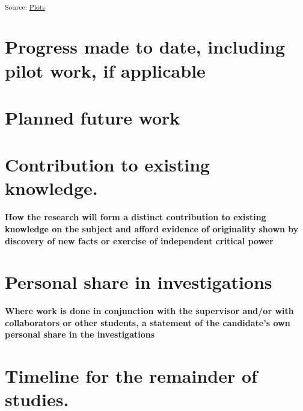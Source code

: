 \documentclass[
  letterpaper,
  DIV=11,
  numbers=noendperiod]{scrartcl}
\begin{document}
\textsubscript{Source:
\href{https://juliam98.github.io/phd-upgrade-proposal/notebooks/plots-preview.html\#cell-fig-lev_hc_vs_sz}{Plots}}

\section{Progress made to date, including pilot work, if
applicable}\label{progress-made-to-date-including-pilot-work-if-applicable}

\section{Planned future work}\label{planned-future-work}

\section{Contribution to existing
knowledge.}\label{contribution-to-existing-knowledge.}

\textbf{How the research will form a distinct contribution to existing
knowledge on the subject and afford evidence of originality shown by
discovery of new facts or exercise of independent critical power}

\section{Personal share in
investigations}\label{personal-share-in-investigations}

\textbf{Where work is done in conjunction with the supervisor and/or
with collaborators or other students, a statement of the candidate's own
personal share in the investigations}

\section{Timeline for the remainder of
studies.}\label{timeline-for-the-remainder-of-studies.}
\end{document}
